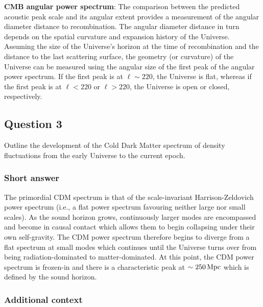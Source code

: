 \documentclass[a4paper,11pt]{article}
\begin{document}
{\noindent}\textbf{CMB angular power spectrum}: The comparison between the predicted acoustic peak scale and its angular extent provides a measurement of the angular diameter distance to recombination. The angular diameter distance in turn depends on the spatial curvature and expansion history of the Universe. Assuming the size of the Universe's horizon at the time of recombination and the distance to the last scattering surface, the geometry (or curvature) of the Universe can be measured using the angular size of the first peak of the angular power spectrum. If the first peak is at $\ell\sim220$, the Universe is flat, whereas if the first peak is at $\ell<220$ or $\ell>220$, the Universe is open or closed, respectively.

%
%

\newpage
\subsection{Question 3}

Outline the development of the Cold Dark Matter spectrum of density fluctuations from the early Universe to the current epoch.

\subsubsection{Short answer}

The primordial CDM spectrum is that of the scale-invariant Harrison-Zeldovich power spectrum (i.e., a flat power spectrum favouring neither large nor small scales). As the sound horizon grows, continuously larger modes are encompassed and become in causal contact which allows them to begin collapsing under their own self-gravity. The CDM power spectrum therefore begins to diverge from a flat spectrum at small modes which continues until the Universe turns over from being radiation-dominated to matter-dominated. At this point, the CDM power spectrum is frozen-in and there is a characteristic peak at $\sim250\,{\rm Mpc}$ which is defined by the sound horizon.

\subsubsection{Additional context}
\end{document}
